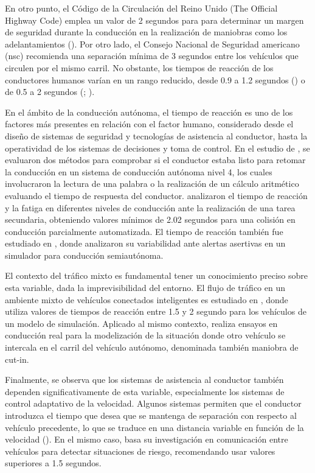 En otro punto, el Código de la Circulación del Reino Unido (The Official Highway Code) emplea un valor de 2 segundos para para determinar un margen de seguridad durante la conducción en la realización de maniobras como los adelantamientos (\cite{department}). Por otro lado, el Consejo Nacional de Seguridad americano (\gls{nsc}) recomienda una separación mínima de 3 segundos entre los vehículos que circulen por el mismo carril. No obstante, los tiempos de reacción de los conductores humanos varían en un rango reducido, desde 0.9 a 1.2 segundos (\cite{johansson}) o de 0.5 a 2 segundos (\cite{aparicio}; \cite{orosz}). 

En el ámbito de la conducción autónoma, el tiempo de reacción es uno de los factores más presentes en relación con el factor humano, considerado desde el diseño de sistemas de seguridad y tecnologías de asistencia al conductor, hasta la operatividad de los sistemas de decisiones y toma de control. En el estudio de \textcite{jimenez18}, se evaluaron dos métodos para comprobar si el conductor estaba listo para retomar la conducción en un sistema de conducción autónoma nivel 4, los cuales involucraron la lectura de una palabra o la realización de un cálculo aritmético evaluando el tiempo de respuesta del conductor. \textcite{naujoks18} analizaron el tiempo de reacción y la fatiga en diferentes niveles de conducción ante la realización de una tarea secundaria, obteniendo valores mínimos de 2.02 segundos para una colisión en conducción parcialmente automatizada. El tiempo de reacción también fue estudiado en \textcite{wong}, donde analizaron su variabilidad ante alertas asertivas en un simulador para conducción semiautónoma.

El contexto del tráfico mixto es fundamental tener un conocimiento preciso sobre esta variable, dada la imprevisibilidad del entorno. El flujo de tráfico en un ambiente mixto de vehículos conectados inteligentes es estudiado en \textcite{chang}, donde utiliza valores de tiempos de reacción entre 1.5 y 2 segundo para los vehículos de un modelo de simulación. Aplicado al mismo contexto, \textcite{fu} realiza ensayos en conducción real para la modelización de la situación donde otro vehículo se intercala en el carril del vehículo autónomo, denominada también maniobra de cut-in.

Finalmente, se observa que los sistemas de asistencia al conductor también dependen significativamente de esta variable, especialmente los sistemas de control adaptativo de la velocidad. Algunos sistemas permiten que el conductor introduzca el tiempo que desea que se mantenga de separación con respecto al vehículo precedente, lo que se traduce en una distancia variable en función de la velocidad (\textcite{prestl}). En el mismo caso, \textcite{pomerleau} basa su investigación en comunicación entre vehículos para detectar situaciones de riesgo, recomendando usar valores superiores a 1.5 segundos.

